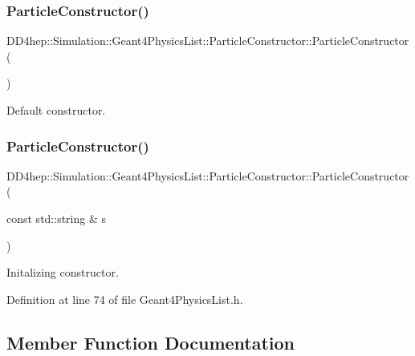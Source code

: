 \subsubsection{\texorpdfstring{Particle\+Constructor()}{ParticleConstructor()}\hspace{0.1cm}{\footnotesize\ttfamily [1/2]}}
{\footnotesize\ttfamily D\+D4hep\+::\+Simulation\+::\+Geant4\+Physics\+List\+::\+Particle\+Constructor\+::\+Particle\+Constructor (\begin{DoxyParamCaption}{ }\end{DoxyParamCaption})\hspace{0.3cm}{\ttfamily [default]}}



Default constructor. 

\hypertarget{class_d_d4hep_1_1_simulation_1_1_geant4_physics_list_1_1_particle_constructor_a3c4a6b9ead0cd6c10487c07c3376931d}{}\label{class_d_d4hep_1_1_simulation_1_1_geant4_physics_list_1_1_particle_constructor_a3c4a6b9ead0cd6c10487c07c3376931d} 
\subsubsection{\texorpdfstring{Particle\+Constructor()}{ParticleConstructor()}\hspace{0.1cm}{\footnotesize\ttfamily [2/2]}}
{\footnotesize\ttfamily D\+D4hep\+::\+Simulation\+::\+Geant4\+Physics\+List\+::\+Particle\+Constructor\+::\+Particle\+Constructor (\begin{DoxyParamCaption}\item[{const std\+::string \&}]{s }\end{DoxyParamCaption})\hspace{0.3cm}{\ttfamily [inline]}}



Initalizing constructor. 



Definition at line 74 of file Geant4\+Physics\+List.\+h.



\subsection{Member Function Documentation}
\hypertarget{class_d_d4hep_1_1_simulation_1_1_geant4_physics_list_1_1_particle_constructor_a54d456bf5a4f13eeedeaefd879f4f1c8}{}\label{class_d_d4hep_1_1_simulation_1_1_geant4_physics_list_1_1_particle_constructor_a54d456bf5a4f13eeedeaefd879f4f1c8} 
